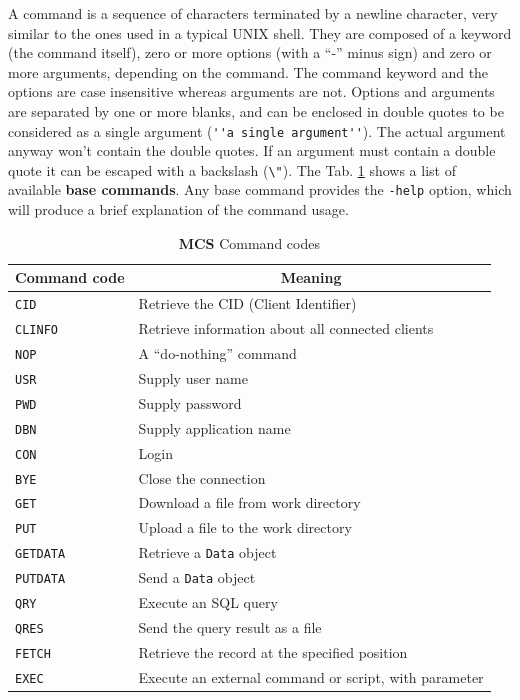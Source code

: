 \documentclass[12pt,titlepage]{article}
\newcommand{\mcs}{\textbf{MCS} }
\begin{document}
A command is a sequence of characters terminated by a newline
character, very similar to the ones used in a typical UNIX shell. They
are composed of a keyword (the command itself), zero or more options
(with a ``-'' minus sign) and zero or more arguments, depending on the
command. The command keyword and the options are case insensitive
whereas arguments are not. Options and arguments are separated by one or
more blanks, and can be enclosed in double quotes to be considered as
a single argument (\verb|''a single argument''|). The actual
argument anyway won't contain the double quotes. If an argument must
contain a double quote it can be escaped with a backslash
(\verb|\"|). The Tab. \ref{tabComandi} shows a list of available
\textbf{base commands}. Any base command provides the \verb|-help|
option, which will produce a brief explanation of the command usage.
%
\begin{table}[!hbt]
\begin{center}
\caption{\mcs Command codes}\label{tabComandi}
\bigskip
\begin{tabular}{|l|l|}
  \multicolumn{1}{c}{\textbf{Command code}} &
  \multicolumn{1}{c}{\textbf{Meaning}} \\
  \hline %
  \hline %
\verb|CID    |&Retrieve the CID (Client Identifier)                   \\
\verb|CLINFO |&Retrieve information about all connected clients       \\
\verb|NOP    |&A ``do-nothing'' command                               \\
  \hline %
  \hline %
\verb|USR    |&Supply user name                                       \\
\verb|PWD    |&Supply password                                        \\
\verb|DBN    |&Supply application name                                \\
\verb|CON    |&Login                                                  \\
\verb|BYE    |&Close the connection                                   \\
  \hline %
  \hline %
\verb|GET    |&Download a file from work directory                    \\
\verb|PUT    |&Upload a file to the work directory                    \\
\verb|GETDATA|&Retrieve a \verb|Data| object                          \\
\verb|PUTDATA|&Send a \verb|Data| object                              \\
\verb|QRY    |&Execute an SQL query                                    \\
\verb|QRES   |&Send the query result as a file                        \\
\verb|FETCH  |&Retrieve the record at the specified position          \\
\verb|EXEC   |&Execute an external command or script, with parameter  \\
  \hline %
  \hline %
\end{tabular}
\end{center}
\end{table}
\end{document}

